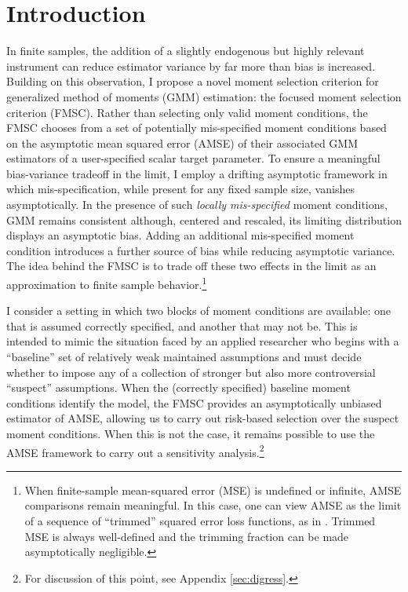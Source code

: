 \section{Introduction}
In finite samples, the addition of a slightly endogenous but highly relevant instrument can reduce estimator variance by far more than bias is increased. 
Building on this observation, I propose a novel moment selection criterion for generalized method of moments (GMM) estimation: the focused moment selection criterion (FMSC). 
Rather than selecting only valid moment conditions, the FMSC chooses from a set of potentially mis-specified moment conditions based on the asymptotic mean squared error (AMSE) of their associated GMM estimators of a user-specified scalar target parameter.
To ensure a meaningful bias-variance tradeoff in the limit, I employ a drifting asymptotic framework in which mis-specification, while present for any fixed sample size, vanishes asymptotically.
In the presence of such \emph{locally mis-specified} moment conditions, GMM remains consistent although, centered and rescaled, its limiting distribution displays an asymptotic bias. Adding an additional mis-specified moment condition introduces a further source of bias while reducing asymptotic variance. 
The idea behind the FMSC is to trade off these two effects in the limit as an approximation to finite sample behavior.\footnote{When finite-sample mean-squared error (MSE) is undefined or infinite, AMSE comparisons remain meaningful. In this case, one can view AMSE as the limit of a sequence of ``trimmed'' squared error loss functions, as in \cite{Hansen2013}. Trimmed MSE is always well-defined and the trimming fraction can be made asymptotically negligible.}
 
I consider a setting in which two blocks of moment conditions are available: one that is assumed correctly specified, and another that may not be.
This is intended to mimic the situation faced by an applied researcher who begins with a ``baseline'' set of relatively weak maintained assumptions and must decide whether to impose any of a collection of stronger but also more controversial ``suspect'' assumptions.
When the (correctly specified) baseline moment conditions identify the model, the FMSC provides an asymptotically unbiased estimator of AMSE, allowing us to carry out risk-based selection over the suspect moment conditions.
When this is not the case, it remains possible to use the AMSE framework to carry out a sensitivity analysis.\footnote{For discussion of this point, see Appendix \ref{sec:digress}.}

